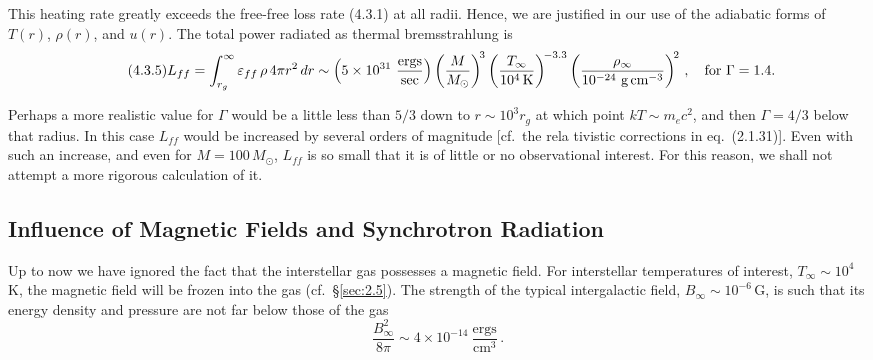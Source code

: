 This heating rate greatly exceeds the free-free loss rate (4.3.1) at all radii.  Hence,
we are justified in our use of the adiabatic forms of $T(r)$, $\rho(r)$, and $u(r)$.  The total
power radiated as thermal bremsstrahlung is
%
\begin{equation}
\tag{4.3.5}
L_{ff}
= \int_{r_g}^{\infty} \varepsilon_{ff}\,\rho\, 4\pi r^2\, dr
\sim \left(5 \times 10^{31}~\frac{\text{ergs}}{\text{sec}}\right)
  \left(\frac{M}{M_\odot}\right)^{\!3}
  \left(\frac{T_\infty}{10^4\,\text{K}}\right)^{\!-3.3}
  \left(\frac{\rho_\infty}{10^{-24}~\text{g\,cm}^{-3}}\right)^{\!2}\,,
  \quad\text{for }\Gamma = 1.4.
\end{equation}

Perhaps a more realistic value for $\Gamma$ would be a little less than $5/3$ down to
$r \sim 10^3 r_g$ at which point $kT \sim m_e c^2$, and then $\Gamma = 4/3$ below that radius.  In
this case $L_{ff}$ would be increased by several orders of magnitude [cf.\ the rela%
tivistic corrections in eq.~(2.1.31)].  Even with such an increase, and even for
$M = 100\,M_\odot$, $L_{ff}$ is so small that it is of little or no observational interest.  For
this reason, we shall not attempt a more rigorous calculation of it.


\subsection{Influence of Magnetic Fields and Synchrotron Radiation}
\label{sec:4.4}

Up to now we have ignored the fact that the interstellar gas possesses a magnetic
field.  For interstellar temperatures of interest, $T_\infty \sim 10^4$\,K, the magnetic field
will be frozen into the gas (cf.\ \S\ref{sec:2.5}).  The strength of the typical intergalactic
field, $B_\infty \sim 10^{-6}$\,G, is such that its energy density and pressure are not far below
those of the gas
%
\begin{equation}
\tag{4.4.1}
\frac{B_\infty^2}{8\pi}
\sim 4 \times 10^{-14}~\frac{\text{ergs}}{\text{cm}^3}\,.
\end{equation}

